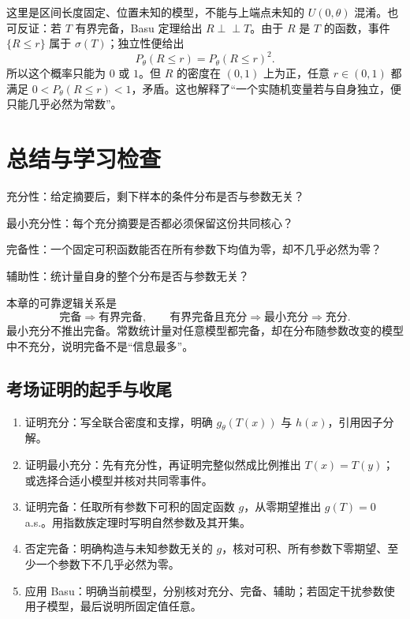 这里是区间长度固定、位置未知的模型，不能与上端点未知的 $U(0,\theta)$ 混淆。也可反证：若 $T$ 有界完备，Basu 定理给出 $R\perp\!\!\!\perp T$。由于 $R$ 是 $T$ 的函数，事件 $\{R\le r\}$ 属于 $\sigma(T)$；独立性便给出
\[
 P_\theta(R\le r)=P_\theta(R\le r)^2.
\]
所以这个概率只能为 $0$ 或 $1$。但 $R$ 的密度在 $(0,1)$ 上为正，任意 $r\in(0,1)$ 都满足 $0<P_\theta(R\le r)<1$，矛盾。这也解释了“一个实随机变量若与自身独立，便只能几乎必然为常数”。

\section{总结与学习检查}

\begin{notebox}
充分性：给定摘要后，剩下样本的条件分布是否与参数无关？

最小充分性：每个充分摘要是否都必须保留这份共同核心？

完备性：一个固定可积函数能否在所有参数下均值为零，却不几乎必然为零？

辅助性：统计量自身的整个分布是否与参数无关？
\end{notebox}

本章的可靠逻辑关系是
\[
 \text{完备}\Rightarrow\text{有界完备},\qquad
 \text{有界完备且充分}\Rightarrow\text{最小充分}\Rightarrow\text{充分}.
\]
最小充分不推出完备。常数统计量对任意模型都完备，却在分布随参数改变的模型中不充分，说明完备不是“信息最多”。

\subsection*{考场证明的起手与收尾}
\begin{enumerate}
\item 证明充分：写全联合密度和支撑，明确 $g_\theta(T(x))$ 与 $h(x)$，引用因子分解。
\item 证明最小充分：先有充分性，再证明完整似然成比例推出 $T(x)=T(y)$；或选择合适小模型并核对共同零事件。
\item 证明完备：任取所有参数下可积的固定函数 $g$，从零期望推出 $g(T)=0$ a.s.。用指数族定理时写明自然参数及其开集。
\item 否定完备：明确构造与未知参数无关的 $g$，核对可积、所有参数下零期望、至少一个参数下不几乎必然为零。
\item 应用 Basu：明确当前模型，分别核对充分、完备、辅助；若固定干扰参数使用子模型，最后说明所固定值任意。
\end{enumerate}

